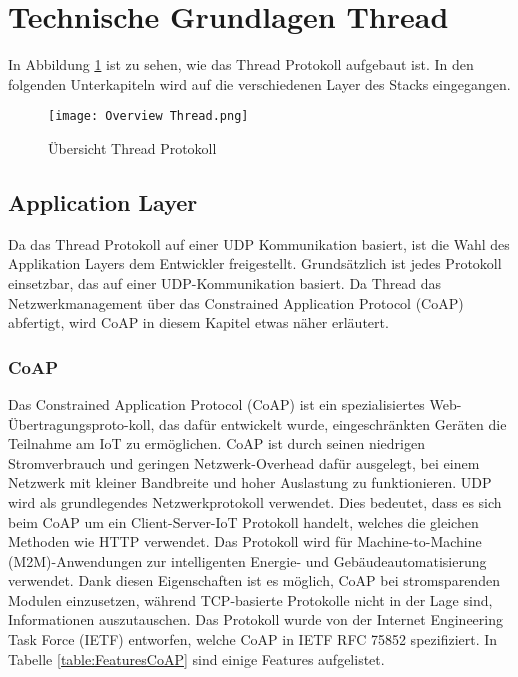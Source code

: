 \clearpage
\section{Technische Grundlagen Thread}\label{sec:TechnischeGrundlagenThread}
In Abbildung \ref{fig:ÜbersichtThreadProtokoll} ist zu sehen, wie das Thread Protokoll aufgebaut ist. In den folgenden Unterkapiteln wird auf die verschiedenen Layer des Stacks eingegangen.
\begin{figure}[H]
	\centering
	\texttt{[image: Overview Thread.png]}
	\caption{Übersicht Thread Protokoll}\label{fig:ÜbersichtThreadProtokoll}
\end{figure}

\subsection{Application Layer}\label{subsec:CoAP}
Da das Thread Protokoll auf einer UDP Kommunikation basiert, ist die Wahl des Applikation Layers dem Entwickler freigestellt. Grundsätzlich ist jedes Protokoll einsetzbar, das auf einer UDP-Kommunikation basiert. Da Thread das Netzwerkmanagement über das Constrained Application Protocol (CoAP) abfertigt, wird CoAP in diesem Kapitel etwas näher erläutert.

\subsubsection{CoAP}\label{subsubsec:CoAP}
Das Constrained Application Protocol (CoAP) ist ein spezialisiertes Web-Übertragungsproto-koll, das dafür entwickelt wurde, eingeschränkten Geräten die Teilnahme am IoT zu ermöglichen. CoAP ist durch seinen niedrigen Stromverbrauch und geringen Netzwerk-Overhead dafür ausgelegt, bei einem Netzwerk mit kleiner Bandbreite und hoher Auslastung zu funktionieren. UDP wird als grundlegendes Netzwerkprotokoll verwendet. Dies bedeutet, dass es sich beim CoAP um ein Client-Server-IoT Protokoll handelt, welches die gleichen Methoden wie HTTP verwendet. Das Protokoll wird für Machine-to-Machine (M2M)-Anwendungen zur intelligenten Energie- und Gebäudeautomatisierung verwendet. Dank diesen Eigenschaften ist es möglich, CoAP bei stromsparenden Modulen einzusetzen, während TCP-basierte Protokolle nicht in der Lage sind, Informationen auszutauschen. Das Protokoll wurde von der Internet Engineering Task Force (IETF) entworfen, welche CoAP in IETF RFC 75852 spezifiziert. In Tabelle \ref{table:FeaturesCoAP} sind einige Features aufgelistet. \cite{shelby_constrained_2014}

